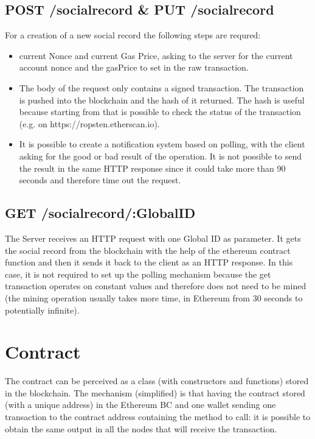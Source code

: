 \subsection{POST /socialrecord \& PUT /socialrecord}
  For a creation of a new social record the following steps are requred:
  \begin{itemize}
    \item \GET current Nonce and current Gas Price, asking to the server for the current account nonce and the gasPrice to set in the raw transaction.
    \item The body of the request only contains a signed transaction. The transaction is pushed into the blockchain and the hash of it returned. The hash is useful because starting from that is possible to check the status of the transaction (e.g. on https://ropsten.etherscan.io).
    \item It is possible to create a notification system based on polling, with the client asking for the good or bad result of the operation. It is not possible to send the result in the same HTTP response since it could take more than 90 seconds and therefore time out the request.
  \end{itemize}
  
\subsection{GET /socialrecord/:GlobalID}
The Server receives an HTTP request with one Global ID as parameter. It gets the social record from the blockchain with the help of the ethereum contract function and then it sends it back to the client as an HTTP response.
In this case, it is not required to set up the polling mechanism because the get transaction operates on constant values and therefore does not need to be mined (the mining operation usually takes more time, in Ethereum from 30 seconds to potentially infinite).

\section{Contract}
The contract can be perceived as a class (with constructors and functions) stored in the blockchain.
The mechanism (simplified) is that having the contract stored (with a unique address) in the Ethereum BC and one wallet sending one transaction to the contract address containing the method to call: it is possible to obtain the same output in all the nodes that will receive the transaction.

